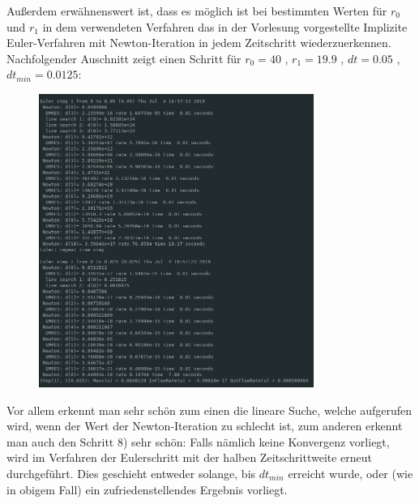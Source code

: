 Außerdem erwähnenswert ist, dass es möglich ist bei bestimmten Werten für $r_0$ und $r_1$ in dem verwendeten Verfahren das in der Vorlesung vorgestellte Implizite Euler-Verfahren mit Newton-Iteration in jedem Zeitschritt wiederzuerkennen.
Nachfolgender Auschnitt zeigt einen Schritt für $r_0 = 40$ , $r_1=19.9$ , $dt = 0.05$ , $dt_{min}=0.0125$:
\begin{figure}[H]
	\centering
	\includegraphics[width=0.80\textwidth]{../Aufgabe30/algorithmus.png}
\end{figure}
Vor allem erkennt man sehr schön zum einen die lineare Suche, welche aufgerufen wird, wenn der Wert der Newton-Iteration zu schlecht ist, zum anderen erkennt man auch den Schritt 8) sehr schön: 
Falls nämlich keine Konvergenz vorliegt, wird im Verfahren der Eulerschritt mit der halben Zeitschrittweite erneut durchgeführt. Dies geschieht entweder solange, bis $dt_{min}$ erreicht wurde, oder (wie in obigem Fall) ein zufriedenstellendes Ergebnis vorliegt.
